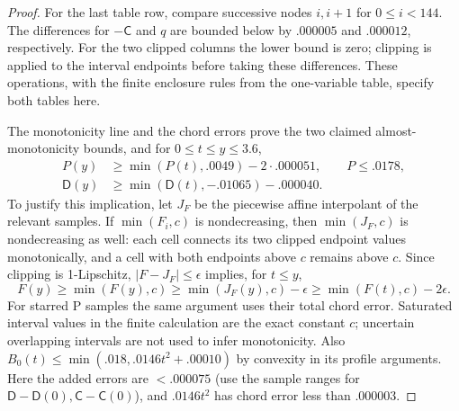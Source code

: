 \begin{proof}
For the last table row, compare successive nodes $i,i+1$ for
$0\le i<144$. The differences for $-\mathsf C$ and $q$ are
bounded below by $.000005$ and $.000012$, respectively. For the two
clipped columns the lower bound is zero; clipping is applied to the
interval endpoints before taking these differences.
These operations, with the finite enclosure rules from the
one-variable table, specify both tables here.

The monotonicity line and the chord errors prove the two claimed almost-monotonicity bounds, and for \(0\le t\le y\le3.6\),
\[
 \begin{aligned}
 P(y)&\ge\min(P(t),.0049)-2\cdot.000051,\qquad P\le.0178,\\
 \mathsf D(y)&\ge\min(\mathsf D(t),-.01065)-.000040 .
 \end{aligned}
\]
To justify this implication, let $J_F$ be the piecewise affine interpolant
of the relevant samples. If $\min(F_i,c)$ is nondecreasing, then
$\min(J_F,c)$ is nondecreasing as well: each cell connects its two
clipped endpoint values monotonically, and a cell with both endpoints
above $c$ remains above $c$. Since clipping is 1-Lipschitz,
$|F-J_F|\le\epsilon$ implies, for $t\le y$,
\[
 F(y)\ge\min(F(y),c)
 \ge\min(J_F(y),c)-\epsilon
 \ge\min(F(t),c)-2\epsilon.
\]
For starred P samples the same argument uses their total chord error.
Saturated interval values in the finite calculation are the exact
constant $c$; uncertain overlapping intervals are not used to infer
monotonicity. Also \(B_0(t)\le\min(.018,.0146t^2+.00010)\) by convexity in its profile arguments. Here the added errors are \(<.000075\) (use the sample ranges for \(\mathsf D-\mathsf D(0),\mathsf C-\mathsf C(0)\)), and \(.0146t^2\) has chord error less than .000003.


\end{proof}

